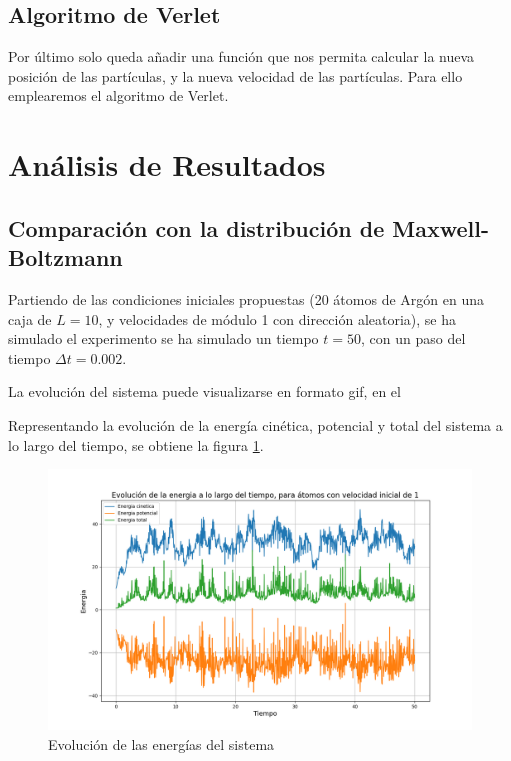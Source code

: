 \documentclass[11pt, twoside]{article} %
\begin{document}
\subsection{Algoritmo de Verlet}

Por último solo queda añadir una función que nos permita calcular la nueva posición
de las partículas, y la nueva velocidad de las partículas. Para ello emplearemos el
algoritmo de Verlet. 

\section{Análisis de Resultados}

\subsection{Comparación con la distribución de Maxwell-Boltzmann}

Partiendo de las condiciones iniciales propuestas (20 átomos de Argón en una caja 
de $L=10$, y velocidades de módulo 1 con dirección aleatoria), se ha simulado el
experimento se ha simulado un tiempo $t = 50$, con un paso del tiempo 
$\Delta t = 0.002$.

La evolución del sistema puede visualizarse en formato gif, en el 

Representando la evolución de la energía cinética, potencial y total del sistema
a lo largo del tiempo, se obtiene la figura \ref{fig:energias}.

\begin{figure}[h!]
    \centering
    \includegraphics[width=\textwidth]{plots/energia_vel_init_1.png}
    \caption{Evolución de las energías del sistema}
    \label{fig:energias}
\end{figure}
\end{document}
